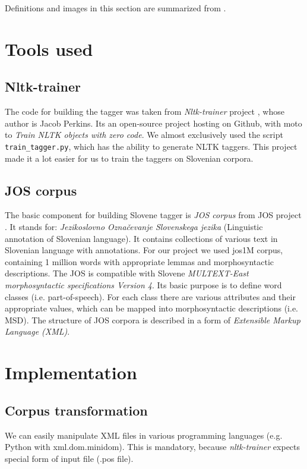 \documentclass[10pt, conference, compsocconf]{IEEEtran}
\begin{document}
Definitions and images in this section are summarized from \cite{NLTKBOOK}.
\section{Tools used}
\label{toolsUsed}
\subsection{Nltk-trainer} %
The code for building the tagger was taken from \textit{Nltk-trainer}  project \cite{nltk-trainer}, whose author is Jacob Perkins.
Its an open-source project hosting on Github, with moto to \textit{Train NLTK objects with zero code}.
We almost exclusively used the script \texttt{train\_tagger.py}, which has the ability to generate NLTK taggers. This project made it a lot easier for us to train the taggers on Slovenian corpora.

\subsection{JOS corpus} %
The basic component for building Slovene tagger is \textit{JOS corpus} from JOS project \cite{JOS}. It stands for: \textit{Jezikoslovno Označevanje Slovenskega jezika} (Linguistic annotation of Slovenian language).
It contains collections of various text in Slovenian language with annotations.
For our project we used jos1M corpus,  containing 1 million words with appropriate lemmas and morphosyntactic descriptions.
The JOS is compatible with Slovene\textit{ MULTEXT-East morphosyntactic specifications Version 4}\cite{MULTEXT-East}.
Its basic purpose is to define word classes (i.e. part-of-speech).
For each class there are various attributes and their appropriate values, which can be mapped into morphosyntactic descriptions (i.e. MSD).
The structure of JOS corpora is described in a form of \textit{Extensible Markup Language (XML)}.

\section{Implementation}
\label{implementation}
\subsection{Corpus transformation} %
\label{Corpus transformation} 

We can easily manipulate XML files in various programming languages (e.g. Python with xml.dom.minidom).
This is mandatory, because \textit{nltk-trainer}\cite{nltk-trainer} expects special form of input file (.pos file).
\end{document}
